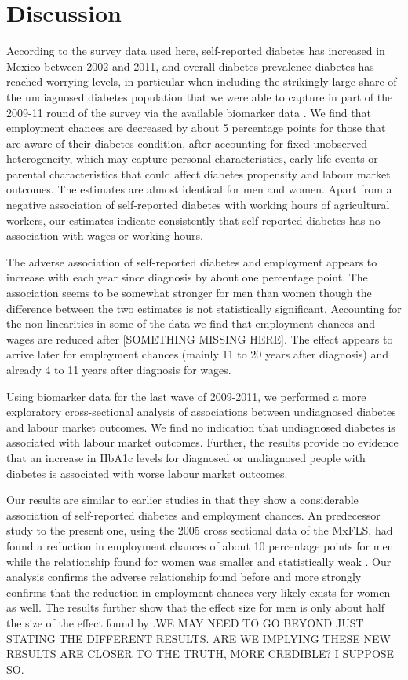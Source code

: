 \section{\noindent \label{sec:Conclusion}Discussion}

According to the survey data used here, self-reported diabetes has increased in Mexico between 2002 and 2011, and overall
diabetes prevalence diabetes has reached worrying
levels, in particular when including the strikingly large share of the undiagnosed diabetes population that we were able to capture in part of the 2009-11 round of the survey via the available biomarker data \citep{Frankenberg2015}. We
find that employment chances are decreased by about 5 percentage points for those that are aware of their
diabetes condition, after accounting for
fixed unobserved heterogeneity, which may capture personal characteristics, early
life events or parental characteristics that could affect diabetes
propensity and labour market outcomes. The estimates are almost identical
for men and women. Apart from a negative association of self-reported
diabetes with working hours of agricultural workers, our estimates
indicate consistently that self-reported diabetes has no association with wages or working hours. 

The adverse association of self-reported diabetes and employment appears
to increase with each year since diagnosis by about one percentage
point. The association seems to be somewhat stronger for men than
women though the difference between the two estimates is not statistically
significant. Accounting for the non-linearities in some of the data
we find that employment chances and wages are reduced after [SOMETHING MISSING HERE]. The effect appears to arrive
later for employment chances (mainly 11 to 20 years after diagnosis)
and already 4 to 11 years after diagnosis for wages. 

Using biomarker data for the last wave of 2009-2011, we performed
a more exploratory cross-sectional analysis of associations between undiagnosed
diabetes and labour market outcomes. We find no indication that undiagnosed
diabetes is associated with labour market outcomes. Further, the results
provide no evidence that an increase in \ac{HbA1c} levels for diagnosed
or undiagnosed people with diabetes is associated with worse labour
market outcomes.

Our results are similar to earlier studies in that they show a considerable
association of self-reported diabetes and employment chances. An predecessor 
study to the present one, using the 2005 cross sectional data of
the \ac{MxFLS}, had found a reduction in employment chances of about
10 percentage points for men while the relationship found for women
was smaller and statistically weak \citep{Seuring2015}. Our analysis
confirms the adverse relationship found before and more strongly confirms
that the reduction in employment chances very likely exists for women
as well. The results further show that the effect size for men is
only about half the size of the effect found by \citet{Seuring2015}.WE MAY NEED TO GO BEYOND JUST STATING THE DIFFERENT RESULTS. ARE WE IMPLYING THESE NEW RESULTS ARE CLOSER TO THE TRUTH, MORE CREDIBLE? I SUPPOSE SO. 


